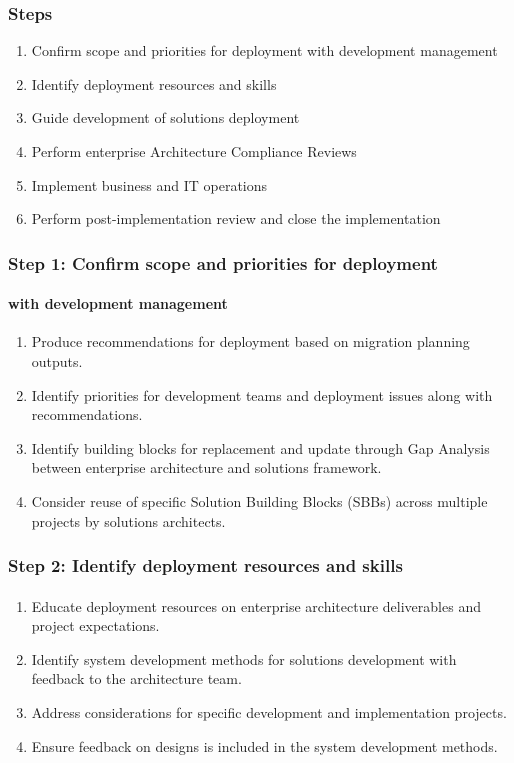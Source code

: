 \documentclass[aspectratio=169, table]{beamer}
\begin{document}
	
	\begin{frame}
		\frametitle{Steps}
		\vspace{20pt}
		\begin{enumerate}
			\item Confirm scope and priorities for deployment with development management
			\item Identify deployment resources and skills
			\item Guide development of solutions deployment
			\item Perform enterprise Architecture Compliance Reviews
			\item Implement business and IT operations
			\item Perform post-implementation review and close the implementation
		\end{enumerate}
		
	\end{frame}
	
	\begin{frame}
		\frametitle{Step 1: Confirm scope and priorities for deployment}
		\framesubtitle{with development management}
		\vspace{20pt}
		\begin{enumerate}
			\item Produce recommendations for deployment based on migration planning outputs.
			\item Identify priorities for development teams and deployment issues along with recommendations.
			\item Identify building blocks for replacement and update through Gap Analysis between enterprise architecture and solutions framework.
			\item Consider reuse of specific Solution Building Blocks (SBBs) across multiple projects by solutions architects.
		\end{enumerate}
		
	\end{frame}
	
	\begin{frame}
		\frametitle{Step 2: Identify deployment resources and skills}
		\framesubtitle{\hspace{1cm}}
		\vspace{20pt}
		\begin{enumerate}
			\item Educate deployment resources on enterprise architecture deliverables and project expectations.
			\item Identify system development methods for solutions development with feedback to the architecture team.
			\item Address considerations for specific development and implementation projects.
			\item Ensure feedback on designs is included in the system development methods.
		\end{enumerate}
		
	\end{frame}
	
\end{document}
